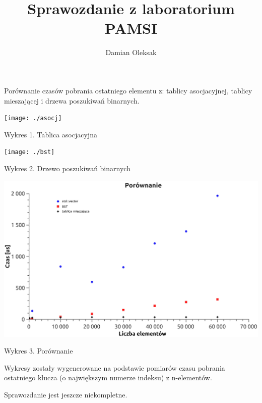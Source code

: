 \documentclass[12pt,a4paper]{article}
\title{Sprawozdanie z laboratorium PAMSI}
\author{Damian Oleksak}
\date{}
\begin{document}
\maketitle
\newpage

Porównanie czasów pobrania ostatniego elementu z: tablicy asocjacyjnej, tablicy mieszającej i drzewa poszukiwań binarnych.\newline


\texttt{[image: ./asocj]}

Wykres 1. Tablica asocjacyjna \newpage


\texttt{[image: ./bst]}

Wykres 2. Drzewo poszukiwań binarnych \newpage

\includegraphics[scale=0.7]{./zb}

Wykres 3. Porównanie \newpage

Wykresy zostały wygenerowane na podstawie pomiarów czasu pobrania ostatniego klucza (o największym numerze indeksu) z n-elementów.    \newline

Sprawozdanie jest jeszcze niekompletne.
\end{document}
